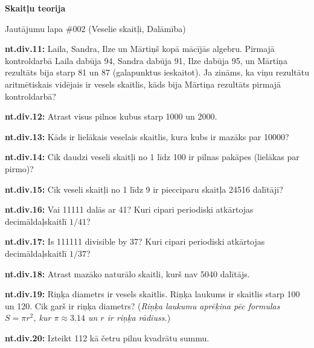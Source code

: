 \documentclass[11pt]{article}
\newenvironment{uzdevums}[1][\unskip]{%
\vspace{3mm}
\noindent
\textbf{#1:}
\noindent}
{}
\begin{document}
\begin{center}
{\LARGE \bf Skaitļu teorija}
\end{center}

\begin{center}
{\large Jautājumu lapa \#002 (Veselie skaitļi, Dalāmība)}
\end{center}

\begin{uzdevums}[nt.div.11]
Laila, Sandra, Ilze un Mārtiņš kopā mācījās algebru. Pirmajā kontroldarbā Laila dabūja 94, Sandra dabūja 91, Ilze dabūja 95, un 
Mārtiņa rezultāts bija starp 81 un 87 (galapunktus ieskaitot). Ja zināms, ka viņu rezultātu aritmētiskais 
vidējais ir vesels skaitlis, kāds bija Mārtiņa rezultāts pirmajā kontroldarbā?
\end{uzdevums}

\begin{uzdevums}[nt.div.12]
Atrast visus pilnos kubus starp 1000 un 2000. 
\end{uzdevums}

\begin{uzdevums}[nt.div.13]
Kāds ir lielākais veselais skaitlis, kura kubs ir mazāks par 10000? 
\end{uzdevums}

\begin{uzdevums}[nt.div.14]
Cik daudzi veseli skaitļi no 1 līdz 100 ir pilnas pakāpes (lielākas par pirmo)?
\end{uzdevums}

\begin{uzdevums}[nt.div.15]
Cik veseli skaitļi no 1 līdz 9 ir piecciparu skaitļa 24516 dalītāji? 
\end{uzdevums}

\begin{uzdevums}[nt.div.16]
Vai 11111 dalās ar 41? 
Kuri cipari periodiski atkārtojas decimāldaļskaitlī $1/41$? 
\end{uzdevums}

\begin{uzdevums}[nt.div.17]
Is 111111 divisible by 37? Kuri cipari periodiski atkārtojas decimāldaļskaitlī $1/37$? 
\end{uzdevums}

\begin{uzdevums}[nt.div.18]
Atrast mazāko naturālo skaitli, kurš nav 5040 dalītājs. 
\end{uzdevums}

\begin{uzdevums}[nt.div.19]
Riņķa diametrs ir vesels skaitlis. Riņķa laukums ir skaitlis starp 100 un 120. 
Cik garš ir riņķa diametrs?
({\em Riņķa laukumu aprēķina pēc formulas $S = \pi r^2$, 
kur $\pi \approx 3.14$ un $r$ ir riņķa rādiuss.})
\end{uzdevums}

\begin{uzdevums}[nt.div.20]
Izteikt 112 kā četru pilnu kvadrātu summu. 
\end{uzdevums}
\end{document}
